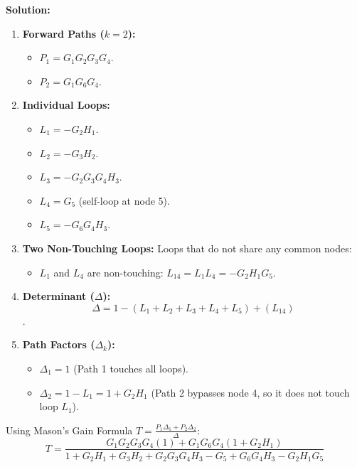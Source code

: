 \documentclass[12pt]{article}
\begin{document}
\textbf{Solution:}
\begin{enumerate}
    \item \textbf{Forward Paths ($k=2$):}
    \begin{itemize}
        \item $P_1 = G_1 G_2 G_3 G_4$.
        \item $P_2 = G_1 G_6 G_4$.
    \end{itemize}
    
    \item \textbf{Individual Loops:}
    \begin{itemize}
        \item $L_1 = -G_2 H_1$.
        \item $L_2 = -G_3 H_2$.
        \item $L_3 = -G_2 G_3 G_4 H_3$.
        \item $L_4 = G_5$ (self-loop at node 5).
        \item $L_5 = -G_6 G_4 H_3$.
    \end{itemize}
    
    \item \textbf{Two Non-Touching Loops:}
    Loops that do not share any common nodes:
    \begin{itemize}
        \item $L_1$ and $L_4$ are non-touching: $L_{14} = L_1 L_4 = -G_2 H_1 G_5$.
    \end{itemize}
    
    \item \textbf{Determinant ($\Delta$):}
    \[ \Delta = 1 - (L_1 + L_2 + L_3 + L_4 + L_5) + (L_{14}) \].
    
    \item \textbf{Path Factors ($\Delta_k$):}
    \begin{itemize}
        \item $\Delta_1 = 1$ (Path 1 touches all loops).
        \item $\Delta_2 = 1 - L_1 = 1 + G_2 H_1$ (Path 2 bypasses node 4, so it does not touch loop $L_1$).
    \end{itemize}
\end{enumerate}

Using Mason's Gain Formula $T = \frac{P_1 \Delta_1 + P_2 \Delta_2}{\Delta}$:
\[ T = \frac{G_1 G_2 G_3 G_4(1) + G_1 G_6 G_4(1 + G_2 H_1)}{1 + G_2 H_1 + G_3 H_2 + G_2 G_3 G_4 H_3 - G_5 + G_6 G_4 H_3 - G_2 H_1 G_5} \] 

\vspace{1cm}
\end{document}
